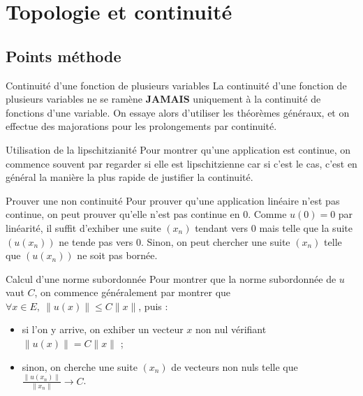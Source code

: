 \documentclass[french]{book}
\theoremstyle{plain}
\theoremstyle{definition}
\theoremstyle{remark}
\begin{document}
\chapter{Topologie et continuité}
\localtableofcontents
\section{Points méthode}
\begin{PM}{Continuité d'une fonction de plusieurs variables} La continuité d'une fonction de plusieurs variables ne se ramène \textbf{JAMAIS} uniquement à la continuité de fonctions d'une variable. On essaye alors d'utiliser les théorèmes généraux, et on effectue des majorations pour les prolongements par continuité.
\end{PM}
\begin{PM}{Utilisation de la lipschitzianité} Pour montrer qu'une application est continue, on commence souvent par regarder si elle est lipschitzienne car si c'est le cas, c'est en général la manière la plus rapide de justifier la continuité.
\end{PM}
\begin{PM}{Prouver une non continuité} Pour prouver qu'une application linéaire n'est pas continue, on peut prouver qu'elle n'est pas continue en $0$. Comme $u(0)=0$ par linéarité, il suffit d'exhiber une suite $(x_n)$ tendant vers $0$ mais telle que la suite $(u(x_n))$ ne tende pas vers $0$. Sinon, on peut chercher une suite $(x_n)$ telle que $(u(x_n))$ ne soit pas bornée.
\end{PM}
\begin{PM}{Calcul d'une norme subordonnée} Pour montrer que la norme subordonnée de $u$ vaut $C$, on commence généralement par montrer que $\forall x\in E,\ \lVert u(x)\rVert\leqslant C\lVert x\rVert$, puis :
\begin{itemize}
	\item si l'on y arrive, on exhiber un vecteur $x$ non nul vérifiant $\lVert u(x)\rVert=C\lVert x\rVert$ ;
	\item sinon, on cherche une suite $(x_n)$ de vecteurs non nuls telle que $\displaystyle\frac{\lVert u(x_n)\rVert}{\lVert x_n\rVert}\to C$.
\end{itemize}
\end{PM}
\end{document}
